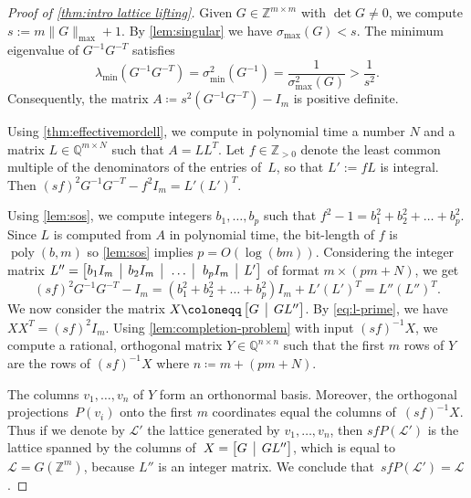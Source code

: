 \documentclass[10pt,a4paper]{article}
\theoremstyle{definition}
\DeclareMathOperator{\poly}{poly}
\newcommand{\QQ}{\mathbb{Q}}
\newcommand{\ZZ}{\mathbb{Z}}
\numberwithin{equation}{section}
\begin{document}
\begin{proof}[Proof of \cref{thm:intro lattice lifting}]
Given $G\in\ZZ^{m\times m}$ with $\det G\neq 0$, we compute
$s := m \|G\|_{\max} + 1 $.
By \cref{lem:singular} we have $\sigma_{\max}(G)< s$.
The minimum eigenvalue of $G^{-1}G^{-T}$ satisfies
\[
\lambda_{\min}(G^{-1}G^{-T}) = \sigma^2_{\min}(G^{-1}) = \frac{1}{\sigma^2_{\max}(G)} > \frac{1}{s^2}.
\]
Consequently, the matrix $A\coloneqq s^2 (G^{-1}G^{-T})-I_m$ is positive definite.

Using \cref{thm:effectivemordell}, we compute in polynomial time a number $N$
and a matrix $L\in\QQ^{m\times N}$ such that $A=LL^T$.
Let $f\in\ZZ_{>0}$ denote the least common multiple of the denominators of the entries of~$L$,
so that $L':=fL$ is integral. Then
$(sf)^2 G^{-1}G^{-T} - f^2 I_m= L'  (L')^T$.

Using \cref{lem:sos}, we compute integers $b_1,\ldots,b_p$ such that $f^2-1=b_1^2+b_2^2+\dots+b_p^2$.
Since $L$ is computed from $A$ in polynomial time, the bit-length of $f$ is $\poly(b,m)$ so \cref{lem:sos} implies $p=O(\log(bm))$.
Considering the integer matrix
$L'' = \begin{bmatrix}
		b_1 I_m \;\;\vline\;\; b_2 I_m \;\;\vline\;\; \dots  \;\;\vline\;\; b_p I_m  \;\;\vline\;\; L'
	\end{bmatrix}$
 of format $m\times (pm+N)$, we get
\begin{equation}\label{eq:l-prime}
 (sf)^2 G^{-1}G^{-T}  - I_m = (b_1^2+b_2^2+\dots+b_p^2)I_m+ L'  (L')^T = L'' (L'')^T.
\end{equation} %
We now consider the matrix $X\coloneqq \begin{bmatrix}
		G  \;\;\vline\;\; GL''
\end{bmatrix}$.
By \cref{eq:l-prime}, we have $XX^T = (sf)^2 I_m$.
Using \cref{lem:completion-problem} with input $(sf)^{-1} X$,
we compute a rational, orthogonal matrix $Y\in\QQ^{n\times n}$
such that the first $m$ rows of $Y$ are the rows of $(sf)^{-1} X$ where $n\coloneqq m+(pm+N)$.

The columns $v_1,\dots,v_n$ of $Y$ form an orthonormal basis. %
Moreover, the orthogonal projections~$P(v_i)$ onto the first $m$ coordinates
equal the columns of~$(sf)^{-1} X$.
Thus if we denote by $\mathcal{L}'$ the lattice generated by $v_1,\dots,v_n$, then $sf P(\mathcal{L}')$ is the lattice spanned by the columns of~$X = \begin{bmatrix}
    G  \;\;\vline\;\; GL''
\end{bmatrix}$, which is equal to $\mathcal L = G(\ZZ^m)$, because $L''$ is an integer matrix.
We conclude that~$sf P(\mathcal{L}')=\mathcal{L}$.
\end{proof}
\end{document}
